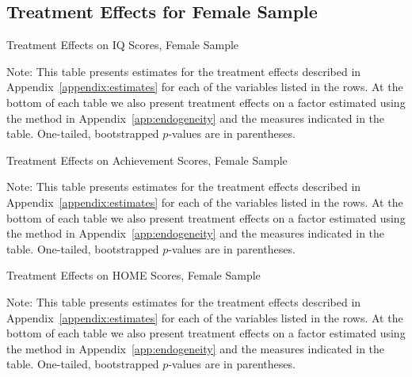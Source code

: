 \subsection{Treatment Effects for Female Sample}


	\begin{table}[H]
     \caption{Treatment Effects on IQ Scores, Female Sample}
     \label{table:abccare_rslt_female_cat0}
	
	\end{table} 
\begin{spacing}{1}
\begin{footnotesize}
\noindent Note: This table presents estimates for the treatment effects described in Appendix~\ref{appendix:estimates} for each of the variables listed in the rows. At the bottom of each table we also present treatment effects on a factor estimated using the method in Appendix~\ref{app:endogeneity} and the measures indicated in the table. One-tailed, bootstrapped $p$-values are in parentheses.
\end{footnotesize}
\end{spacing}

	\begin{table}[H]
     \caption{Treatment Effects on Achievement Scores, Female Sample}
     \label{table:abccare_rslt_female_cat1}
	
	\end{table} 
	\begin{spacing}{1}
\begin{footnotesize}
\noindent Note: This table presents estimates for the treatment effects described in Appendix~\ref{appendix:estimates} for each of the variables listed in the rows. At the bottom of each table we also present treatment effects on a factor estimated using the method in Appendix~\ref{app:endogeneity} and the measures indicated in the table. One-tailed, bootstrapped $p$-values are in parentheses.
\end{footnotesize}
\end{spacing}

	\begin{table}[H]
     \caption{Treatment Effects on HOME Scores, Female Sample}
     \label{table:abccare_rslt_female_cat2}
	
	\end{table} 
\begin{spacing}{1}
\begin{footnotesize}
\noindent Note: This table presents estimates for the treatment effects described in Appendix~\ref{appendix:estimates} for each of the variables listed in the rows. At the bottom of each table we also present treatment effects on a factor estimated using the method in Appendix~\ref{app:endogeneity} and the measures indicated in the table. One-tailed, bootstrapped $p$-values are in parentheses.
\end{footnotesize}
\end{spacing}

